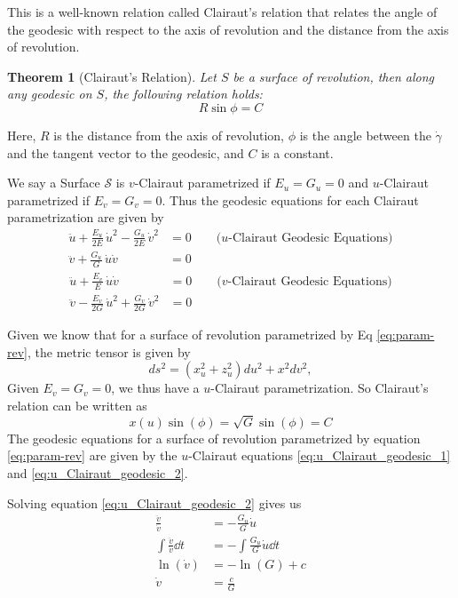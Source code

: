 \documentclass[12pt]{article}
\newtheorem{theorem}[definition]{Theorem}
\begin{document}
This is a well-known relation called Clairaut's relation that relates the angle of the geodesic with respect to the axis of revolution and the distance from the axis of revolution.

\begin{theorem}[Clairaut's Relation]
Let \(S\) be a surface of revolution, then along any geodesic on \(S\), the following relation holds:
\[
R\sin\phi = C
\]
\end{theorem}
Here, \(R\) is the distance from the axis of revolution, \(\phi\) is the angle between the $\dot{\gamma}$ and the tangent vector to the geodesic, and \(C\) is a constant.

We say a Surface $\mathcal{S}$ is $v$-Clairaut parametrized if $E_{u} = G_{u} = 0$ and $u$-Clairaut parametrized if $E_{v} = G_{v} = 0$.
Thus the geodesic equations for each Clairaut parametrization are given by
\begin{align}
    \ddot{u} + \frac{E_{u}}{2E}\,\dot{u}^2 - \frac{G_{u}}{2E}\,\dot{v}^{2} &= 0 \qquad (u\text{-Clairaut Geodesic Equations)} \label{eq:u_Clairaut_geodesic_1}\\
    \ddot{v} + \frac{G_{u}}{G}\,\dot{u}\dot{v} &= 0 \label{eq:u_Clairaut_geodesic_2}
\end{align}
\begin{align}
    \ddot{u} + \frac{E_{v}}{E}\,\dot{u}\dot{v} &= 0 \qquad (v\text{-Clairaut Geodesic Equations)} \label{eq:v_Clairaut_geodesic_1}\\
    \ddot{v} - \frac{E_{v}}{2G}\,\dot{u}^2 + \frac{G_{v}}{2G}\,\dot{v}^2 &= 0 \label{eq:v_Clairaut_geodesic_2}
\end{align}

Given we know that for a surface of revolution parametrized by Eq \eqref{eq:param-rev}, the metric tensor is given by
\[
    ds^2 = \left( x_{u}^2 + z_u^2 \right) du^2 + x^2 dv^2,
\]
Given $E_v = G_v = 0$, we thus have a $u$-Clairaut parametrization.
So Clairaut's relation can be written as
\begin{equation} \label{eq:Clairaut_relation_u}
    x(u) \sin(\phi) = \sqrt{G} \sin(\phi) = C
\end{equation}
The geodesic equations for a surface of revolution parametrized by equation \eqref{eq:param-rev} are given by the $u$-Clairaut equations \eqref{eq:u_Clairaut_geodesic_1} and \eqref{eq:u_Clairaut_geodesic_2}.

Solving equation \eqref{eq:u_Clairaut_geodesic_2} gives us
\begin{align*}
    \frac{\ddot{v}}{\dot{v}} &= -\frac{G_{u}}{G}\dot{u} \\
    \int \frac{\ddot{v}}{\dot{v}} \dd{t} &= -\int \frac{G_{u}}{G}\dot{u} \dd{t} \\
    \ln(\dot{v}) &= -\ln(G) + c \\
    \dot{v} &= \frac{c}{G}
\end{align*}
\end{document}
